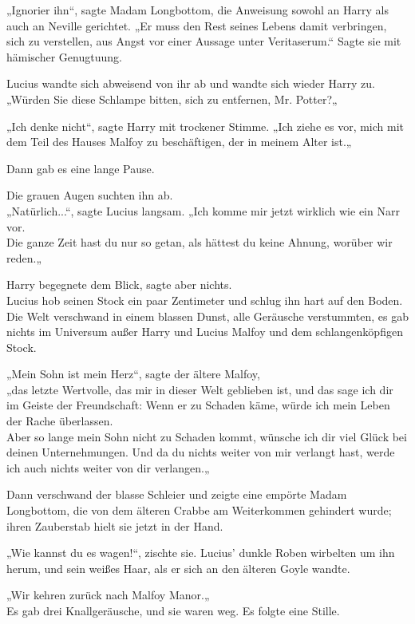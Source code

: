 {„Ignorier ihn“, sagte Madam Longbottom, die Anweisung sowohl an Harry als auch an Neville gerichtet. „Er muss den Rest seines Lebens damit verbringen, sich zu verstellen, aus Angst vor einer Aussage unter Veritaserum.“ Sagte sie mit hämischer Genugtuung.

Lucius wandte sich abweisend von ihr ab und wandte sich wieder Harry zu.\\ „Würden Sie diese Schlampe bitten, sich zu entfernen, Mr. Potter?„

„Ich denke nicht“, sagte Harry mit trockener Stimme. „Ich ziehe es vor, mich mit dem Teil des Hauses Malfoy zu beschäftigen, der in meinem Alter ist.„

Dann gab es eine lange Pause.

Die grauen Augen suchten ihn ab.\\ „Natürlich...“, sagte Lucius langsam. „Ich komme mir jetzt wirklich wie ein Narr vor.\\ Die ganze Zeit hast du nur so getan, als hättest du keine Ahnung, worüber wir reden.„

Harry begegnete dem Blick, sagte aber nichts.\\ Lucius hob seinen Stock ein paar Zentimeter und schlug ihn hart auf den Boden. Die Welt verschwand in einem blassen Dunst, alle Geräusche verstummten, es gab nichts im Universum außer Harry und Lucius Malfoy und dem schlangenköpfigen Stock.

„Mein Sohn ist mein Herz“, sagte der ältere Malfoy,\\ „das letzte Wertvolle, das mir in dieser Welt geblieben ist, und das sage ich dir im Geiste der Freundschaft: Wenn er zu Schaden käme, würde ich mein Leben der Rache überlassen.\\ Aber so lange mein Sohn nicht zu Schaden kommt, wünsche ich dir viel Glück bei deinen Unternehmungen. Und da du nichts weiter von mir verlangt hast, werde ich auch nichts weiter von dir verlangen.„

Dann verschwand der blasse Schleier und zeigte eine empörte Madam Longbottom, die von dem älteren Crabbe am Weiterkommen gehindert wurde; ihren Zauberstab hielt sie jetzt in der Hand.

„Wie kannst du es wagen!“, zischte sie. Lucius' dunkle Roben wirbelten um ihn herum, und sein weißes Haar, als er sich an den älteren Goyle wandte.

„Wir kehren zurück nach Malfoy Manor.„\\ Es gab drei Knallgeräusche, und sie waren weg. Es folgte eine Stille.

}
